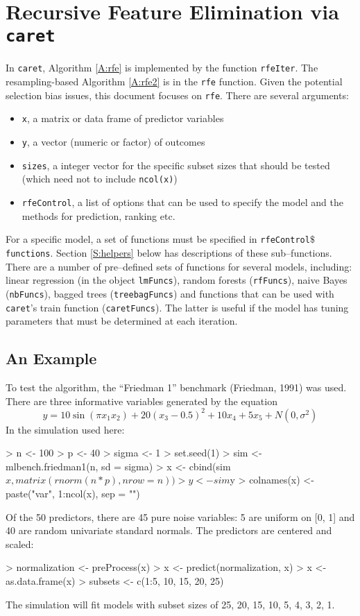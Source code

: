 \documentclass[12pt]{article}
\begin{document}
\clearpage
\section{Recursive Feature Elimination via \texttt{caret}}

In \texttt{caret}, Algorithm \ref{A:rfe} is implemented by the function \texttt{rfeIter}. The resampling-based Algorithm \ref{A:rfe2} is in the \texttt{rfe} function. Given the potential selection bias issues, this document focuses on \texttt{rfe}.  There are several arguments:
\begin{itemize}
\item \texttt{x}, a matrix or data frame of predictor variables
\item \texttt{y}, a vector (numeric or factor) of outcomes
\item \texttt{sizes}, a integer vector for the specific subset sizes that should be tested (which need not to include \texttt{ncol(x)}) 
\item \texttt{rfeControl}, a list of options that can be used to specify the model and the methods for prediction, ranking etc.
\end{itemize}
For a specific model, a set of functions must be specified in \texttt{rfeControl$\$$functions}. Section \ref{S:helpers} below has descriptions of these sub--functions. There are a number of pre--defined sets of functions for several models, including: linear regression (in the object \texttt{lmFuncs}), random forests (\texttt{rfFuncs}), naive Bayes (\texttt{nbFuncs}), bagged trees (\texttt{treebagFuncs}) and functions that can be used with \texttt{caret}'s train function (\texttt{caretFuncs}). The latter is useful if the model has tuning parameters that must be determined at each iteration.


\subsection{An Example}


To test the algorithm, the ``Friedman 1'' benchmark (Friedman, 1991) was used. There are three informative variables generated by the equation
\[
y = 10 \sin(\pi x_1x_2) + 20 (x_3 - 0.5)^2 + 10 x_4 + 5 x_5 + N(0, \sigma^2)
\]
In the simulation used here:
\begin{Schunk}
\begin{Sinput}
> n <- 100
> p <- 40
> sigma <- 1
> set.seed(1)
> sim <- mlbench.friedman1(n, sd = sigma)
> x <- cbind(sim$x, matrix(rnorm(n * p), nrow = n))
> y <- sim$y
> colnames(x) <- paste("var", 1:ncol(x), sep = "")
\end{Sinput}
\end{Schunk}
Of the 50 predictors, there are 45 pure noise variables: 5 are uniform on [0, 1] and 40 are random univariate standard normals. The predictors are centered and scaled:
\begin{Schunk}
\begin{Sinput}
> normalization <- preProcess(x)
> x <- predict(normalization, x)
> x <- as.data.frame(x)
> subsets <- c(1:5, 10, 15, 20, 25)
\end{Sinput}
\end{Schunk}
The simulation will fit models with subset sizes of 25, 20, 15, 10, 5, 4, 3, 2, 1. 
\end{document}
